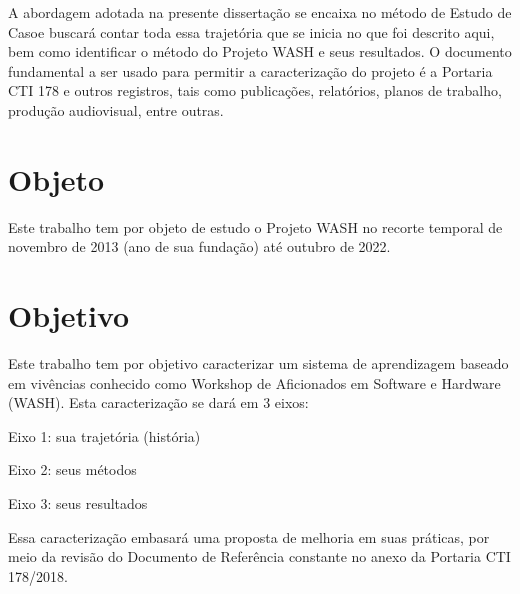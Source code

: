 \documentclass[
12pt,		%
openright,	%
twoside,  %
a4paper,			%
chapter=TITLE,		%
english,			%
french,				%
spanish,			%
brazil				%
]{USPSC-classe/USPSC}
\begin{document}
A abordagem adotada na presente disserta\c{c}\~ao se encaixa no m\'etodo de \textquotedbl Estudo de Caso\textquotedbl  e buscar\'a contar toda essa trajet\'oria que se inicia no que foi descrito aqui, bem como identificar o m\'etodo do Projeto WASH e seus resultados. O documento fundamental a ser usado para permitir a caracteriza\c{c}\~ao do projeto \'e a Portaria CTI 178 e outros registros, tais como publica\c{c}\~oes, relat\'orios, planos de trabalho, produ\c{c}\~ao audiovisual, entre outras.










\section[Objeto]{Objeto}\label{Objeto}
Este trabalho tem por objeto de estudo o  Projeto WASH no recorte temporal de novembro de 2013 (ano de sua funda\c{c}\~ao) at\'e outubro de 2022.










\section[Objetivo]{Objetivo}\label{Objetivo}
Este trabalho tem por objetivo caracterizar um sistema de aprendizagem baseado em viv\^encias conhecido como \textquotedbl Workshop de Aficionados em Software e Hardware (WASH)\textquotedbl . Esta caracteriza\c{c}\~ao se dar\'a em 3 eixos:











\begin{alineas}
\item Eixo 1: sua trajet\'oria (hist\'oria)
\item Eixo 2: seus m\'etodos
\item Eixo 3: seus resultados
\end{alineas}

Essa caracteriza\c{c}\~ao embasar\'a uma proposta de melhoria em suas pr\'aticas, por meio da revis\~ao do Documento de Refer\^encia constante no anexo da Portaria CTI 178/2018.
\end{document}
